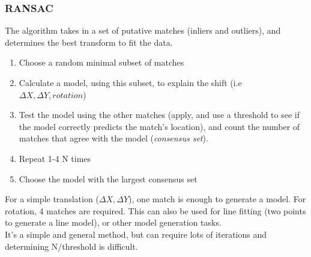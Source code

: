 \subsubsection{RANSAC}
The algorithm takes in a set of putative matches (inliers and outliers), and determines the best transform to fit the data.
\begin{enumerate}
    \item Choose a random minimal subset of matches
    \item Calculate a model, using this subset, to explain the shift (i.e $\Delta X, \Delta Y, rotation$)
    \item Test the model using the other matches (apply, and use a threshold to see if the model correctly predicts the match's location), and count the number of matches that agree with the model (\emph{consensus set}).
    \item Repeat 1-4 N times
    \item Choose the model with the largest consensus set
\end{enumerate}
For a simple translation ($\Delta X, \Delta Y$), one match is enough to generate a model. For rotation, 4 matches are required. This can also be used for line fitting (two points to generate a line model), or other model generation tasks.\\
It's a simple and general method, but can require lots of iterations and determining N/threshold is difficult. 

